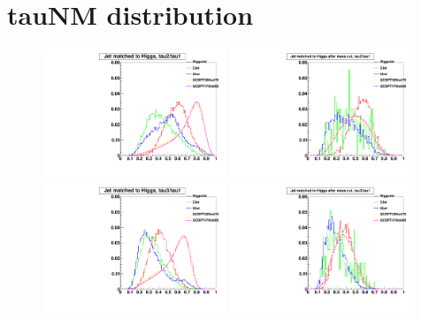 \newpage
\section{tauNM distribution}
\label{appendix:tauNM}

\begin{figure}[h!tpb]
\begin{center}
\includegraphics[width=0.49\textwidth]{EXO-14-009/HqqqqZqqfigs/tauNM/Tau21Pre.pdf}
\includegraphics[width=0.49\textwidth]{EXO-14-009/HqqqqZqqfigs/tauNM/Tau21After.pdf}
\includegraphics[width=0.49\textwidth]{EXO-14-009/HqqqqZqqfigs/tauNM/Tau31Pre.pdf}
\includegraphics[width=0.49\textwidth]{EXO-14-009/HqqqqZqqfigs/tauNM/Tau31After.pdf}

\end{center}
\end{figure}
